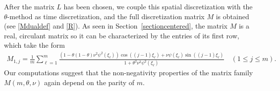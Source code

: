 \documentclass[smallextended,numbook,runningheads]{svjour3}     %
\begin{document}
After the matrix $L$ has been chosen, we couple this spatial discretization with the $\theta$-method as time
discretization, and the full discretization matrix $M$ is obtained (see \eqref{Mdualdef} and \eqref{R}).
As seen in Section~\ref{sectioncentered}, the matrix $M$ is a real, circulant matrix so it can be characterized by the entries of its first row,
which take the form
\begin{align}\label{M1j_FD}
	  M_{1,j}  = \frac{1}{m} \sum_{\ell=1}^{m} \frac{\left(1-\theta(1-\theta)\nu^2\psi^2(\xi_\ell)\right)
  \cos((j-1)\xi_\ell) + \nu \psi(\xi_\ell)\sin((j-1)\xi_\ell)}{1+\theta^2\nu^2 \psi^2(\xi_\ell)} \quad (1\le j \le m).
\end{align}
Our computations suggest that the non-negativity properties of the matrix family $M(m,\theta,\nu)$ again
depend on the parity of $m$.
\end{document}
